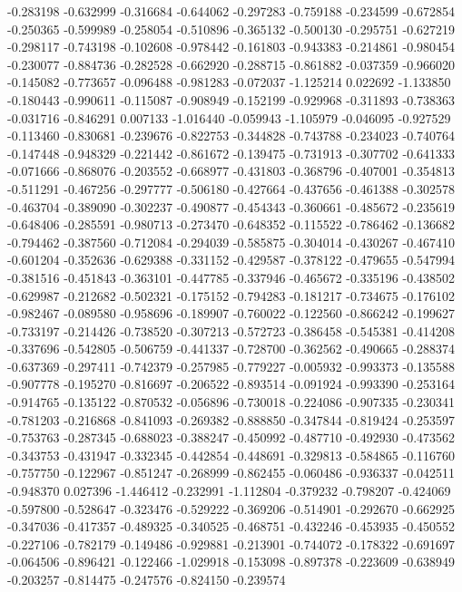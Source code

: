 -0.283198
-0.632999
-0.316684
-0.644062
-0.297283
-0.759188
-0.234599
-0.672854
-0.250365
-0.599989
-0.258054
-0.510896
-0.365132
-0.500130
-0.295751
-0.627219
-0.298117
-0.743198
-0.102608
-0.978442
-0.161803
-0.943383
-0.214861
-0.980454
-0.230077
-0.884736
-0.282528
-0.662920
-0.288715
-0.861882
-0.037359
-0.966020
-0.145082
-0.773657
-0.096488
-0.981283
-0.072037
-1.125214
0.022692
-1.133850
-0.180443
-0.990611
-0.115087
-0.908949
-0.152199
-0.929968
-0.311893
-0.738363
-0.031716
-0.846291
0.007133
-1.016440
-0.059943
-1.105979
-0.046095
-0.927529
-0.113460
-0.830681
-0.239676
-0.822753
-0.344828
-0.743788
-0.234023
-0.740764
-0.147448
-0.948329
-0.221442
-0.861672
-0.139475
-0.731913
-0.307702
-0.641333
-0.071666
-0.868076
-0.203552
-0.668977
-0.431803
-0.368796
-0.407001
-0.354813
-0.511291
-0.467256
-0.297777
-0.506180
-0.427664
-0.437656
-0.461388
-0.302578
-0.463704
-0.389090
-0.302237
-0.490877
-0.454343
-0.360661
-0.485672
-0.235619
-0.648406
-0.285591
-0.980713
-0.273470
-0.648352
-0.115522
-0.786462
-0.136682
-0.794462
-0.387560
-0.712084
-0.294039
-0.585875
-0.304014
-0.430267
-0.467410
-0.601204
-0.352636
-0.629388
-0.331152
-0.429587
-0.378122
-0.479655
-0.547994
-0.381516
-0.451843
-0.363101
-0.447785
-0.337946
-0.465672
-0.335196
-0.438502
-0.629987
-0.212682
-0.502321
-0.175152
-0.794283
-0.181217
-0.734675
-0.176102
-0.982467
-0.089580
-0.958696
-0.189907
-0.760022
-0.122560
-0.866242
-0.199627
-0.733197
-0.214426
-0.738520
-0.307213
-0.572723
-0.386458
-0.545381
-0.414208
-0.337696
-0.542805
-0.506759
-0.441337
-0.728700
-0.362562
-0.490665
-0.288374
-0.637369
-0.297411
-0.742379
-0.257985
-0.779227
-0.005932
-0.993373
-0.135588
-0.907778
-0.195270
-0.816697
-0.206522
-0.893514
-0.091924
-0.993390
-0.253164
-0.914765
-0.135122
-0.870532
-0.056896
-0.730018
-0.224086
-0.907335
-0.230341
-0.781203
-0.216868
-0.841093
-0.269382
-0.888850
-0.347844
-0.819424
-0.253597
-0.753763
-0.287345
-0.688023
-0.388247
-0.450992
-0.487710
-0.492930
-0.473562
-0.343753
-0.431947
-0.332345
-0.442854
-0.448691
-0.329813
-0.584865
-0.116760
-0.757750
-0.122967
-0.851247
-0.268999
-0.862455
-0.060486
-0.936337
-0.042511
-0.948370
0.027396
-1.446412
-0.232991
-1.112804
-0.379232
-0.798207
-0.424069
-0.597800
-0.528647
-0.323476
-0.529222
-0.369206
-0.514901
-0.292670
-0.662925
-0.347036
-0.417357
-0.489325
-0.340525
-0.468751
-0.432246
-0.453935
-0.450552
-0.227106
-0.782179
-0.149486
-0.929881
-0.213901
-0.744072
-0.178322
-0.691697
-0.064506
-0.896421
-0.122466
-1.029918
-0.153098
-0.897378
-0.223609
-0.638949
-0.203257
-0.814475
-0.247576
-0.824150
-0.239574
